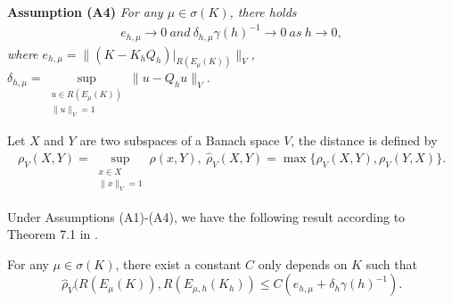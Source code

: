 \documentclass[leqno,CJK]{siamltex704}
\numberwithin{equation}{section}
\begin{document}
	\textbf{Assumption (A4)}\emph{ For any $\mu\in\sigma(K)$, there holds
		\begin{eqnarray*}
			e_{h,\mu}\rightarrow 0\ and \ \delta_{h,\mu}\gamma(h)^{-1}\rightarrow 0\ as \ h\rightarrow 0,
		\end{eqnarray*}
		where $e_{h,\mu} = \|(K-K_hQ_h)|_{R(E_\mu(K))}\|_V$, $\delta_{h,\mu} = \sup\limits_{\substack{u\in R(E_\mu(K))\\ \|u\|_V=1}}\|u-Q_h u\|_V$.
	}
	

	
	
	Let $X$ and $Y$ are two subspaces of a Banach space $V$, the distance is defined by
	\begin{eqnarray}
		\rho_V(X,Y)=\sup_{\substack{x\in X\\\|x\|_V=1}} \rho(x,Y),~
		\hat \rho_V(X,Y)=\max\{\rho_V(X,Y),\rho_V(Y,X)\}.
	\end{eqnarray}
	
	Under Assumptions (A1)-(A4), we have the following result according to Theorem 7.1 in \cite{MR1115240}.
	\begin{theorem}\label{thm-vnorm}
		 For any $\mu\in\sigma(K)$, there exist a constant $C$ only depends on $K$ such that
		\begin{equation*}
			\hat \rho_V(R(E_\mu(K)), R(E_{\mu,h}(K_h)) \le C(e_{h,\mu}+\delta_h\gamma(h)^{-1}).
		\end{equation*}
	\end{theorem}
	
\end{document}
